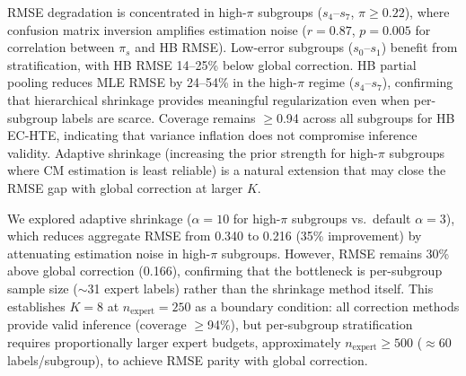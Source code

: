 \begin{table}[h]
\centering
\caption{Per-subgroup RMSE at $K{=}8$. HB improvement over MLE is largest in high-$\pi$ subgroups but does not close the gap with Global.}
\label{tab:k8_per_subgroup}
\small
{}
\end{table}

RMSE degradation is concentrated in high-$\pi$ subgroups ($s_4$--$s_7$, $\pi \geq 0.22$), where confusion matrix inversion amplifies estimation noise ($r = 0.87$, $p = 0.005$ for correlation between $\pi_s$ and HB RMSE).
Low-error subgroups ($s_0$--$s_1$) benefit from stratification, with HB RMSE 14--25\% below global correction.
HB partial pooling reduces MLE RMSE by 24--54\% in the high-$\pi$ regime ($s_4$--$s_7$), confirming that hierarchical shrinkage provides meaningful regularization even when per-subgroup labels are scarce.
Coverage remains $\geq$0.94 across all subgroups for HB EC-HTE, indicating that variance inflation does not compromise inference validity.
Adaptive shrinkage (increasing the prior strength for high-$\pi$ subgroups where CM estimation is least reliable) is a natural extension that may close the RMSE gap with global correction at larger $K$.

We explored adaptive shrinkage ($\alpha{=}10$ for high-$\pi$ subgroups vs.\ default $\alpha{=}3$), which reduces aggregate RMSE from 0.340 to 0.216 (35\% improvement) by attenuating estimation noise in high-$\pi$ subgroups.
However, RMSE remains 30\% above global correction (0.166), confirming that the bottleneck is per-subgroup sample size (${\sim}$31 expert labels) rather than the shrinkage method itself.
This establishes $K{=}8$ at $n_{\text{expert}}{=}250$ as a boundary condition: all correction methods provide valid inference (coverage $\geq$94\%), but per-subgroup stratification requires proportionally larger expert budgets, approximately $n_{\text{expert}} \geq 500$ (${\approx}60$ labels/subgroup), to achieve RMSE parity with global correction.

